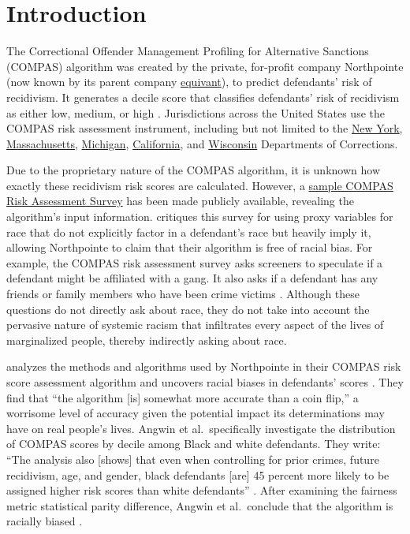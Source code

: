 \documentclass[water,article,submit,moreauthors,pdftex]{mdpi}
\begin{document}

\hypertarget{introduction}{%
\section{Introduction}\label{introduction}}

The Correctional Offender Management Profiling for Alternative Sanctions
(COMPAS) algorithm was created by the private, for-profit company
Northpointe (now known by its parent company
\href{https://www.equivant.com/faq/}{equivant}), to predict defendants'
risk of recidivism. It generates a decile score that classifies
defendants' risk of recidivism as either low, medium, or high
\citep{angwin2016machine}. Jurisdictions across the United States use
the COMPAS risk assessment instrument, including but not limited to the
\href{https://doccs.ny.gov/system/files/documents/2020/11/8500.pdf}{New
York},
\href{https://hdsr.mitpress.mit.edu/pub/hzwo7ax4/release/4}{Massachusetts},
\href{https://hdsr.mitpress.mit.edu/pub/hzwo7ax4/release/4}{Michigan},
\href{https://hdsr.mitpress.mit.edu/pub/hzwo7ax4/release/4}{California},
and \href{https://doc.wi.gov/Pages/AboutDOC/COMPAS.aspx}{Wisconsin}
Departments of Corrections.

Due to the proprietary nature of the COMPAS algorithm, it is unknown how
exactly these recidivism risk scores are calculated. However, a
\href{https://www.documentcloud.org/documents/2702103-Sample-Risk-Assessment-COMPAS-CORE\#document/p5/a296598}{sample
COMPAS Risk Assessment Survey} has been made publicly available,
revealing the algorithm's input information. \citet{angwin2016machine}
critiques this survey for using proxy variables for race that do not
explicitly factor in a defendant's race but heavily imply it, allowing
Northpointe to claim that their algorithm is free of racial bias. For
example, the COMPAS risk assessment survey asks screeners to speculate
if a defendant might be affiliated with a gang. It also asks if a
defendant has any friends or family members who have been crime victims
\citep{Angwin2016Sample}. Although these questions do not directly ask
about race, they do not take into account the pervasive nature of
systemic racism that infiltrates every aspect of the lives of
marginalized people, thereby indirectly asking about race.

\citet{angwin2016machine} analyzes the methods and algorithms used by
Northpointe in their COMPAS risk score assessment algorithm and uncovers
racial biases in defendants' scores \citep{angwin2016machine}. They find
that ``the algorithm {[}is{]} somewhat more accurate than a coin flip,''
a worrisome level of accuracy given the potential impact its
determinations may have on real people's lives. Angwin et
al.~specifically investigate the distribution of COMPAS scores by decile
among Black and white defendants. They write: ``The analysis also
{[}shows{]} that even when controlling for prior crimes, future
recidivism, age, and gender, black defendants {[}are{]} 45 percent more
likely to be assigned higher risk scores than white defendants''
\citep{larson2016we}. After examining the fairness metric statistical
parity difference, Angwin et al.~conclude that the algorithm is racially
biased \citep{larson2016we}.
\end{document}
